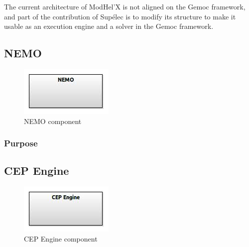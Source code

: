 \documentclass{gemoc} %
\begin{document}
The current architecture of ModHel'X is not aligned on the Gemoc framework, and part of the contribution of Sup\'elec is to modify its structure to make it usable as an execution engine and a solver in the Gemoc framework.



\subsection{NEMO}

\begin{figure}[htp]
	\begin{center}
	\includegraphics*[trim=0.0cm 0.0cm 0cm 0.0cm, clip=true, scale=1.0]{../images/generated/Generated_NEMO.jpg}
	\caption{NEMO component}
	\end{center}
\end{figure}

\subsubsection{Purpose}



\subsection{CEP Engine}

\begin{figure}[htp]
	\begin{center}
	\includegraphics*[trim=0.0cm 0.0cm 0cm 0.0cm, clip=true, scale=1.0]{../images/generated/Generated_CEP Engine.jpg}
	\caption{CEP Engine component}
	\end{center}
\end{figure}
\end{document}
